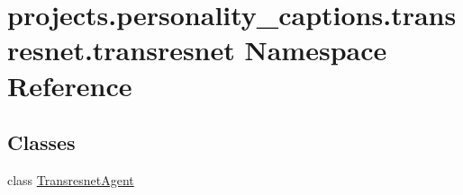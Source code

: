 \hypertarget{namespaceprojects_1_1personality__captions_1_1transresnet_1_1transresnet}{}\section{projects.\+personality\+\_\+captions.\+transresnet.\+transresnet Namespace Reference}
\label{namespaceprojects_1_1personality__captions_1_1transresnet_1_1transresnet}
\subsection*{Classes}
\begin{DoxyCompactItemize}
\item 
class \hyperlink{classprojects_1_1personality__captions_1_1transresnet_1_1transresnet_1_1TransresnetAgent}{Transresnet\+Agent}
\end{DoxyCompactItemize}

